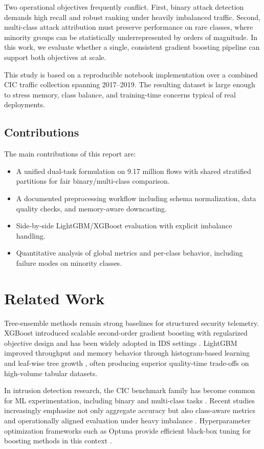 \documentclass[10pt,journal]{IEEEtran}
\begin{document}
Two operational objectives frequently conflict. First, binary attack detection demands high recall and robust ranking under heavily imbalanced traffic. Second, multi-class attack attribution must preserve performance on rare classes, where minority groups can be statistically underrepresented by orders of magnitude. In this work, we evaluate whether a single, consistent gradient boosting pipeline can support both objectives at scale.

This study is based on a reproducible notebook implementation over a combined CIC traffic collection spanning 2017--2019. The resulting dataset is large enough to stress memory, class balance, and training-time concerns typical of real deployments.

\subsection{Contributions}
The main contributions of this report are:
\begin{itemize}
\item A unified dual-task formulation on \num{9.17} million flows with shared stratified partitions for fair binary/multi-class comparison.
\item A documented preprocessing workflow including schema normalization, data quality checks, and memory-aware downcasting.
\item Side-by-side LightGBM/XGBoost evaluation with explicit imbalance handling.
\item Quantitative analysis of global metrics and per-class behavior, including failure modes on minority classes.
\end{itemize}

\section{Related Work}
Tree-ensemble methods remain strong baselines for structured security telemetry. XGBoost introduced scalable second-order gradient boosting with regularized objective design and has been widely adopted in IDS settings \cite{chen2016xgboost}. LightGBM improved throughput and memory behavior through histogram-based learning and leaf-wise tree growth \cite{ke2017lightgbm}, often producing superior quality-time trade-offs on high-volume tabular datasets.

In intrusion detection research, the CIC benchmark family has become common for ML experimentation, including binary and multi-class tasks \cite{sharafaldin2018toward}. Recent studies increasingly emphasize not only aggregate accuracy but also class-aware metrics and operationally aligned evaluation under heavy imbalance \cite{ring2019survey}. Hyperparameter optimization frameworks such as Optuna provide efficient black-box tuning for boosting methods in this context \cite{akiba2019optuna}.
\end{document}
